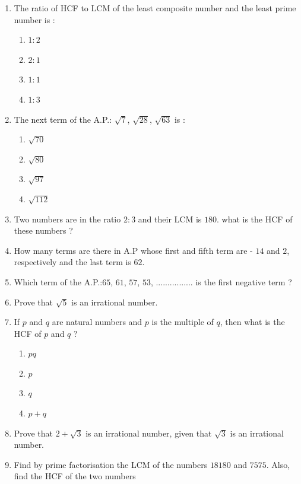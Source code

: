 %
\begin{enumerate}
    \item  The ratio of HCF to LCM of the least composite number and the least prime number is :
    \begin{enumerate}[label=(\alph*)]
      \item $1:2$
      \item $2:1$
      \item $1:1$
      \item $1:3$
    \end{enumerate}
    \item The next term of the A.P.: $\sqrt{7}$, $\sqrt{28}$, $\sqrt{63}$ is :
    \begin{enumerate}[label=(\alph*)]
      \item $\sqrt{70}$
      \item $\sqrt{80}$
      \item $\sqrt{97}$
      \item $\sqrt{112}$
    \end{enumerate}
    \item Two numbers are in the ratio $2:3$ and their LCM is $180$. what is the HCF of these numbers ?
    \item How many terms are there in A.P whose first and fifth term are - $14$ and $2$, respectively and the last term is $62$.
    \item Which term of the A.P.:$65$, $61$, $57$, $53$, ................ is the first negative term ?
    \item Prove that $\sqrt{5}$ is an irrational number.
    \item If $p$ and $q$ are natural numbers and $p$ is the multiple of  $q$, then what is the HCF of $p$ and $q$ ?
    \begin{enumerate}[label=(\alph*)]
      \item $pq$
      \item $p$
      \item $q$
      \item $p+q$
      \end{enumerate}
    \item Prove that $2+\sqrt{3}$ is an irrational number, given that $\sqrt{3}$ is an irrational number.
        \item Find by prime factorisation the LCM of the numbers $18180$ and $7575$. Also, find the HCF of the two numbers

\end{enumerate}
